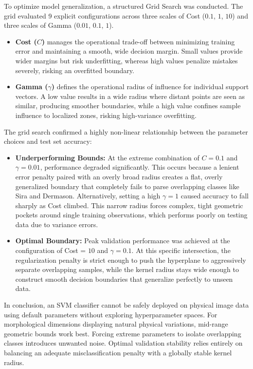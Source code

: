 \documentclass{article}
\begin{document}
To optimize model generalization, a structured Grid Search was conducted. The grid evaluated 9 explicit configurations across three scales of Cost ($0.1$, $1$, $10$) and three scales of Gamma ($0.01$, $0.1$, $1$).

\begin{itemize}
    \item \textbf{Cost ($C$)} manages the operational trade-off between minimizing training error and maintaining a smooth, wide decision margin. Small values provide wider margins but risk underfitting, whereas high values penalize mistakes severely, risking an overfitted boundary.
    \item \textbf{Gamma ($\gamma$)} defines the operational radius of influence for individual support vectors. A low value results in a wide radius where distant points are seen as similar, producing smoother boundaries, while a high value confines sample influence to localized zones, risking high-variance overfitting.
\end{itemize}

The grid search confirmed a highly non-linear relationship between the parameter choices and test set accuracy:

\begin{itemize}
    \item \textbf{Underperforming Bounds:} At the extreme combination of $C = 0.1$ and $\gamma = 0.01$, performance degraded significantly. This occurs because a lenient error penalty paired with an overly broad radius creates a flat, overly generalized boundary that completely fails to parse overlapping classes like Sira and Dermason. Alternatively, setting a high $\gamma = 1$ caused accuracy to fall sharply as Cost climbed. This narrow radius forces complex, tight geometric pockets around single training observations, which performs poorly on testing data due to variance errors.
    \item \textbf{Optimal Boundary:} Peak validation performance was achieved at the configuration of Cost = $10$ and $\gamma = 0.1$. At this specific intersection, the regularization penalty is strict enough to push the hyperplane to aggressively separate overlapping samples, while the kernel radius stays wide enough to construct smooth decision boundaries that generalize perfectly to unseen data.
\end{itemize}

In conclusion, an SVM classifier cannot be safely deployed on physical image data using default parameters without exploring hyperparameter spaces. For morphological dimensions displaying natural physical variations, mid-range geometric bounds work best. Forcing extreme parameters to isolate overlapping classes introduces unwanted noise. Optimal validation stability relies entirely on balancing an adequate misclassification penalty with a globally stable kernel radius.
\end{document}
